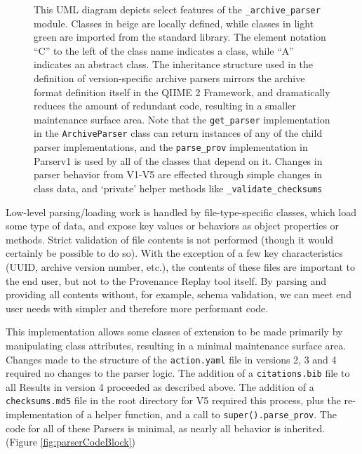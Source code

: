 \begin{figure}[htp]
\begin{minipage}[c]{0.5\textwidth}
    \end{minipage}\hfill
    \begin{minipage}[c]{0.45\textwidth}
\caption[UML Class diagram of the Version-specific Archive Parsers]%
{This UML diagram depicts select features of the \texttt{\_archive\_parser} module. Classes
in beige are locally defined, while classes in light green are imported from the
standard library. The element notation “C” to the left of the class name
indicates a class, while “A” indicates an abstract class. The inheritance
structure used in the definition of version-specific archive parsers mirrors the
archive format definition itself in the QIIME 2 Framework, and dramatically
reduces the amount of redundant code, resulting in a smaller maintenance surface
area. Note that the \texttt{get\_parser} implementation in the \texttt{ArchiveParser} class can
return instances of any of the child parser implementations, and the \texttt{parse\_prov}
implementation in Parserv1 is used by all of the classes that depend on it.
Changes in parser behavior from V1-V5 are effected through simple changes in
class data, and ‘private’ helper methods like \texttt{\_validate\_checksums}}
    \end{minipage}
    \label{fig:archiveParsersUML}
\end{figure}

Low-level parsing/loading work is handled by file-type-specific classes, which
load some type of data, and expose key values or behaviors as object properties
or methods. Strict validation of file contents is not performed (though it would
certainly be possible to do so). With the exception of a few key characteristics
(UUID, archive version number, etc.), the contents of these files are important
to the end user, but not to the Provenance Replay tool itself. By parsing and
providing all contents without, for example, schema validation, we can meet end
user needs with simpler and therefore more performant code.

This implementation allows some classes of extension to be made primarily by
manipulating class attributes, resulting in a minimal maintenance surface area.
Changes made to the structure of the \texttt{action.yaml} file in versions 2, 3 and 4
required no changes to the parser logic. The addition of a \texttt{citations.bib} file to
all Results in version 4 proceeded as described above. The addition of a
\texttt{checksums.md5} file in the root directory for V5 required this process, plus the
re-implementation of a helper function, and a call to \texttt{super().parse\_prov}. The
code for all of these Parsers is minimal, as nearly all behavior is inherited. 
(Figure \ref{fig:parserCodeBlock})

